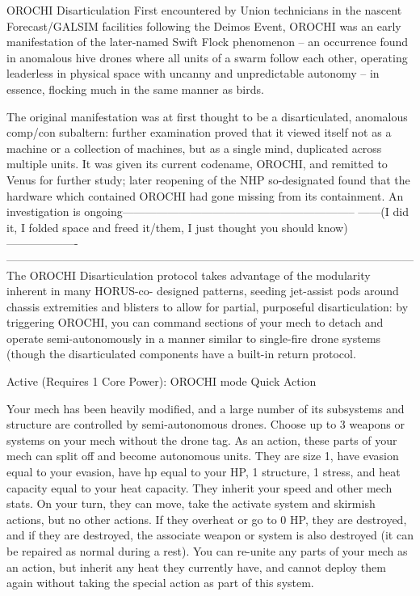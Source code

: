                                                OROCHI Disarticulation  
 First encountered by Union technicians in the nascent Forecast/GALSIM facilities following the Deimos  
 Event, OROCHI was an early manifestation of the later-named Swift Flock phenomenon -- an  
 occurrence found in anomalous hive drones where all units of a swarm follow each other, operating  
 leaderless in physical space with uncanny and unpredictable autonomy -- in essence, flocking much in  
  the same manner as birds.   

  The original manifestation was at first thought to be a disarticulated, anomalous comp/con subaltern:  
 further examination proved that it viewed itself not as a machine or a collection of machines, but as a  
 single mind, duplicated across multiple units. It was given its current codename, OROCHI, and remitted  
  to Venus for further study; later reopening of the NHP so-designated found that the hardware which  
 contained OROCHI had gone missing from its containment. An investigation is  
 ongoing--------------------------------------------------------------  
 ------(I did it, I folded space and freed it/them, I just thought you should know)-------------------     
 ------------------------------------------------------------------------------------------------------------  
  The OROCHI Disarticulation protocol takes advantage of the modularity inherent in many HORUS-co- 
 designed patterns, seeding jet-assist pods around chassis extremities and blisters to allow for partial,  
 purposeful disarticulation: by triggering OROCHI, you can command sections of your mech to detach  
 and operate semi-autonomously in a manner similar to single-fire drone systems (though the  
 disarticulated components have a built-in return protocol.    

 Active (Requires 1 Core Power): OROCHI mode  
  Quick Action
 
 Your mech has been heavily modified, and a large number of its subsystems and structure are  
  controlled by semi-autonomous drones. Choose up to 3 weapons or systems on your mech without the  
  drone tag. As an action, these parts of your mech can split off and become autonomous units. They are  
  size 1, have evasion equal to your evasion, have hp equal to your HP, 1 structure, 1 stress, and heat  
  capacity equal to your heat capacity. They inherit your speed and other mech stats. On your turn, they  
  can move, take the activate system and skirmish actions, but no other actions. If they overheat or go to  
  0 HP, they are destroyed, and if they are destroyed, the associate weapon or system is also destroyed  
  (it can be repaired as normal during a rest). You can re-unite any parts of your mech as an action, but  
  inherit any heat they currently have, and cannot deploy them again without taking the special action as  
  part of this system.  

